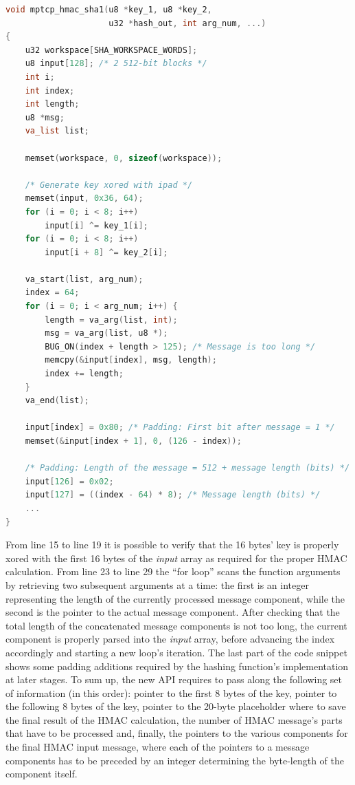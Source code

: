 \begin{lstlisting}[language=c, caption=Implementation for the new \textit{mptcp\_hmac\_sha1() function (first part)}, label=newhmac]
void mptcp_hmac_sha1(u8 *key_1, u8 *key_2, 
                     u32 *hash_out, int arg_num, ...)
{
    u32 workspace[SHA_WORKSPACE_WORDS];
	u8 input[128]; /* 2 512-bit blocks */
	int i;
	int index;
	int length;
	u8 *msg;
	va_list list;

	memset(workspace, 0, sizeof(workspace));

	/* Generate key xored with ipad */
	memset(input, 0x36, 64);
	for (i = 0; i < 8; i++)
		input[i] ^= key_1[i];
	for (i = 0; i < 8; i++)
		input[i + 8] ^= key_2[i];

	va_start(list, arg_num);
	index = 64;
	for (i = 0; i < arg_num; i++) {
		length = va_arg(list, int);
		msg = va_arg(list, u8 *);
		BUG_ON(index + length > 125); /* Message is too long */
		memcpy(&input[index], msg, length);
		index += length;
	}
	va_end(list);

	input[index] = 0x80; /* Padding: First bit after message = 1 */
	memset(&input[index + 1], 0, (126 - index));

	/* Padding: Length of the message = 512 + message length (bits) */
	input[126] = 0x02;
	input[127] = ((index - 64) * 8); /* Message length (bits) */
	...
}
\end{lstlisting}

From line 15 to line 19 it is possible to verify that the 16 bytes' key is properly xored with the first 16 bytes of the \textit{input} array as required for the proper HMAC calculation. From line 23 to line 29 the ``for loop'' scans the function arguments by retrieving two subsequent arguments at a time: the first is an integer representing the length of the currently processed message component, while the second is the pointer to the actual message component. After checking that the total length of the concatenated message components is not too long, the current component is properly parsed into the \textit{input} array, before advancing the index accordingly and starting a new loop's iteration. The last part of the code snippet shows some padding additions required by the hashing function's implementation at later stages. 
To sum up, the new API requires to pass along the following set of information (in this order): pointer to the first 8 bytes of the key, pointer to the following 8 bytes of the key, pointer to the 20-byte placeholder where to save the final result of the HMAC calculation, the number of HMAC message's parts that have to be processed and, finally, the pointers to the various components for the final HMAC input message, where each of the pointers to a message components has to be preceded by an integer determining the byte-length of the component itself.

